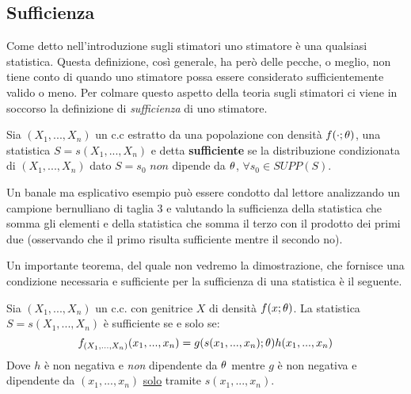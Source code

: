 \subsection{Sufficienza}

Come detto nell'introduzione sugli stimatori uno stimatore è una qualsiasi statistica. Questa definizione, così generale, ha però delle pecche, o meglio, non tiene conto di quando uno stimatore possa essere considerato sufficientemente valido o meno. Per colmare questo aspetto della teoria sugli stimatori ci viene in soccorso la definizione di \textit{sufficienza} di uno stimatore.

\vspace{5px}

\begin{definition}
Sia $(X_1,...,X_n)$ un c.c estratto da una popolazione con densità $f(\cdot;\theta)$, una statistica $S=s(X_1,...,X_n)$ e detta \textbf{sufficiente} se la distribuzione condizionata di $(X_1,...,X_n)$ dato ${S=s_0}$ $non$ dipende da $\theta$, $\forall s_0\in SUPP(S)$.
\end{definition}

\vspace{5px}

Un banale ma esplicativo esempio può essere condotto dal lettore analizzando un campione bernulliano di taglia 3 e valutando la sufficienza della statistica che somma gli elementi e della statistica che somma il terzo con il prodotto dei primi due (osservando che il primo risulta sufficiente mentre il secondo no).

Un importante teorema, del quale non vedremo la dimostrazione, che fornisce una condizione necessaria e sufficiente per la sufficienza di una statistica è il seguente.

\begin{theorem}
Sia $(X_1,...,X_n)$ un c.c. con genitrice $X$ di densità $f(x;\theta)$. La statistica $S=s(X_1,...,X_n)$ è sufficiente se e solo se: \[f_{(X_1,...,X_n)}(x_1,...,x_n)=g(s(x_1,...,x_n);\theta)h(x_1,...,x_n)\]
Dove $h$ è non negativa e \textit{non} dipendente da $\theta$ mentre $g$ è non negativa e dipendente da $(x_1,...,x_n)$ \underline{solo} tramite $s(x_1,...,x_n)$.
\end{theorem}